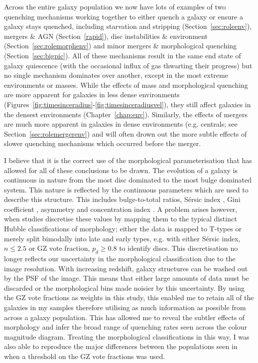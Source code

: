 Across the entire galaxy population we now have lots of examples of two quenching mechanisms working together to either quench a galaxy or ensure a galaxy stays quenched, including starvation and stripping (Section~\ref{sec:roleenv}), mergers \& AGN (Section~\ref{rapid}), disc instabilities \&  environment (Section~\ref{sec:rolemorphenv}) and minor mergers \& morphological quenching (Section~\ref{sec:bigpic}). All of these mechanisms result in the same end state of galaxy quiescence (with the occasional influx of gas thwarting their progress) but no single mechanism dominates over another, except in the most extreme environments or masses. While the effects of mass and morphological quenching are more apparent for galaxies in less dense environments (Figures~\ref{fig:timesinceradius}-\ref{fig:timesinceradiusvel}), they still affect galaxies in the densest environments (Chapter~\ref{chap:env}). Similarly, the effects of mergers are much more apparent in galaxies in dense environments (e.g. centrals; see Section~\ref{sec:rolemergerenv}) and will often drown out the more subtle effects of slower quenching mechanisms which occurred before the merger. %

I believe that it is the correct use of the morphological parameterisation that has allowed for all of these conclusions to be drawn. The evolution of a galaxy is continuous in nature from the most disc dominated to the most bulge dominated system. This nature is reflected by the continuous parameters which are used to describe this structure. This includes bulge-to-total ratios, S\'ersic index \citep{sersic68}, Gini coefficient \citep{abraham03, lotz04}, asymmetry \citep{conselice00} and concentration index \citep{morgan58}. A problem arises however, when studies discretise these values by mapping them to the typical distinct Hubble classifications of morphology; either the data is mapped to T-types \citep{shimasaku01, brinchmann04, nair10b, barro15} or merely split bimodally into late and early types, e.g. with either S\'ersic index, $n \leq 2.5$ \citep{ravindranath04, kelvin12, vika15} or GZ vote fraction, $p_d \geq 0.8$ \citep{schawinski14} to identify discs. This discretisation no longer reflects our uncertainty in the morphological classification due to the image resolution. With increasing redshift, galaxy structures can be washed out by the PSF of the image. This means that either large amounts of data must be discarded or the morphological bins made noisier by this uncertainty. By using the GZ vote fractions as weights in this study, this enabled me to retain all of the galaxies in my samples therefore utilising as much information as possible from across a galaxy population. This has allowed me to reveal the subtler effects of morphology and infer the broad range of quenching rates seen across the colour magnitude diagram. Treating the morphological classifications in this way, I was also able to reproduce the major differences between the populations seen in \cite{schawinski14} when a threshold on the GZ vote fractions was used.

